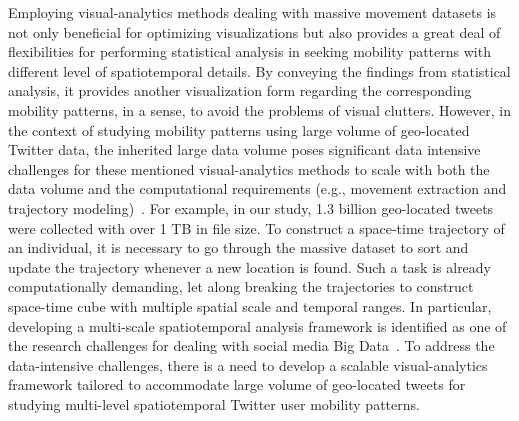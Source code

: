 \documentclass[a4paper, 11pt]{article}
\begin{document}
Employing visual-analytics methods dealing with massive movement datasets is not only beneficial for optimizing visualizations but also provides a great deal of flexibilities for performing statistical analysis in seeking mobility patterns with different level of spatiotemporal details. 
By conveying the findings from statistical analysis, it provides another visualization form regarding the corresponding mobility patterns, in a sense, to avoid the problems of visual clutters.
However, in the context of studying mobility patterns using large volume of geo-located Twitter data, the inherited large data volume poses significant data intensive challenges for these mentioned visual-analytics methods to scale with both the data volume and the computational requirements (e.g., movement extraction and trajectory modeling)~\citep{cao2014scalable}.
For example, in our study, 1.3 billion geo-located tweets were collected with over 1 TB in file size.
To construct a space-time trajectory of an individual, it is necessary to go through the massive dataset to sort and update the trajectory whenever a new location is found. 
Such a task is already computationally demanding, let along breaking the trajectories to construct space-time cube with multiple spatial scale and temporal ranges. 
In particular, developing a multi-scale spatiotemporal analysis framework is identified as one of the research challenges for dealing with social media Big Data~\citep{tsou2015}. 
To address the data-intensive challenges, there is a need to develop a scalable visual-analytics framework tailored to accommodate large volume of geo-located tweets for studying multi-level spatiotemporal Twitter user mobility patterns.
\end{document}
